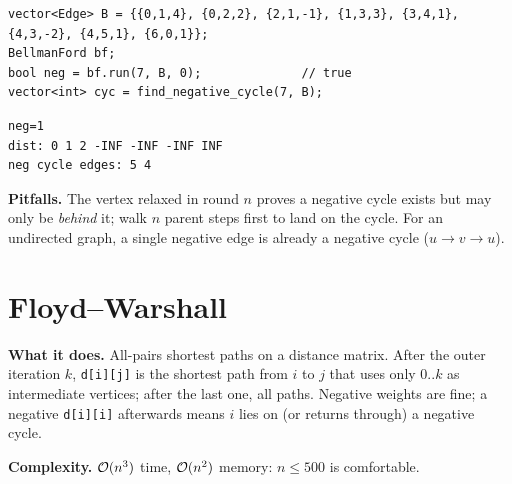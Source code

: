 \begin{lstlisting}[style=snippet]
vector<Edge> B = {{0,1,4}, {0,2,2}, {2,1,-1}, {1,3,3}, {3,4,1}, {4,3,-2}, {4,5,1}, {6,0,1}};
BellmanFord bf;
bool neg = bf.run(7, B, 0);              // true
vector<int> cyc = find_negative_cycle(7, B);
\end{lstlisting}
\begin{lstlisting}[style=trace]
neg=1
dist: 0 1 2 -INF -INF -INF INF
neg cycle edges: 5 4
\end{lstlisting}

\textbf{Pitfalls.} The vertex relaxed in round $n$ proves a negative cycle exists but may only be \emph{behind} it; walk $n$ parent steps first to land on the cycle. For an undirected graph, a single negative edge is already a negative cycle ($u\to v\to u$).



\clneed
\section{Floyd--Warshall}
\label{sec:cl-floyd}

\textbf{What it does.} All-pairs shortest paths on a distance matrix. After the outer iteration $k$, \texttt{d[i][j]} is the shortest path from $i$ to $j$ that uses only $0..k$ as intermediate vertices; after the last one, all paths. Negative weights are fine; a negative \texttt{d[i][i]} afterwards means $i$ lies on (or returns through) a negative cycle.

\textbf{Complexity.} $\mathcal{O}(n^3)$ time, $\mathcal{O}(n^2)$ memory: $n\le 500$ is comfortable.

